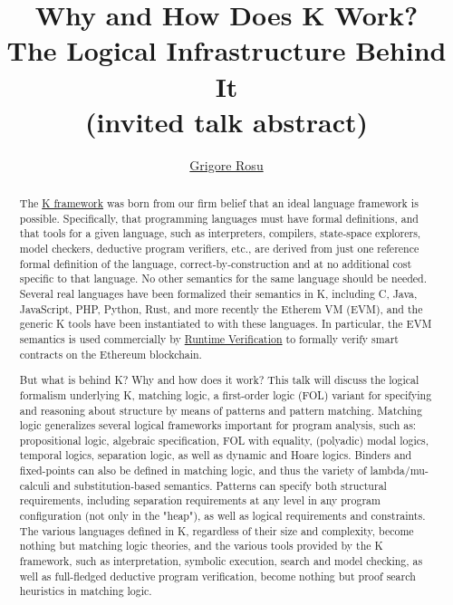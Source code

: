 \documentclass[submission,copyright,creativecommons]{eptcs}
\title{Why and How Does K Work?\\
  The Logical Infrastructure Behind It\\
  {\large (invited talk abstract)}
}
\author{\href{http://fsl.cs.illinois.edu/index.php/Grigore_Rosu}{Grigore Rosu}
  \institute{University of Illinois at Urbana-Champaign}
  \email{grosu@illinois.edu}
}
\begin{document}
\maketitle

\begin{abstract}
  The \href{http://kframework.org/}{K framework} was born from our
  firm belief that an ideal language framework is
  possible. Specifically, that programming languages must have formal
  definitions, and that tools for a given language, such as
  interpreters, compilers, state-space explorers, model checkers,
  deductive program verifiers, etc., are derived from just one
  reference formal definition of the language, correct-by-construction
  and at no additional cost specific to that language. No other
  semantics for the same language should be needed. Several real
  languages have been formalized their semantics in K, including C,
  Java, JavaScript, PHP, Python, Rust, and more recently the Etherem
  VM (EVM), and the generic K tools have been instantiated to with
  these languages. In particular, the EVM semantics is used
  commercially by \href{http://runtimeverification.com/}{Runtime
    Verification} to formally verify smart contracts on the Ethereum
  blockchain.

  But what is behind K? Why and how does it work? This talk will
  discuss the logical formalism underlying K, matching logic, a
  first-order logic (FOL) variant for specifying and reasoning about
  structure by means of patterns and pattern matching. Matching logic
  generalizes several logical frameworks important for program
  analysis, such as: propositional logic, algebraic specification, FOL
  with equality, (polyadic) modal logics, temporal logics, separation
  logic, as well as dynamic and Hoare logics. Binders and fixed-points
  can also be defined in matching logic, and thus the variety of
  lambda/mu-calculi and substitution-based semantics. Patterns can
  specify both structural requirements, including separation
  requirements at any level in any program configuration (not only in
  the "heap"), as well as logical requirements and constraints. The
  various languages defined in K, regardless of their size and
  complexity, become nothing but matching logic theories, and the
  various tools provided by the K framework, such as interpretation,
  symbolic execution, search and model checking, as well as
  full-fledged deductive program verification, become nothing but
  proof search heuristics in matching logic.
\end{abstract}
\end{document}

